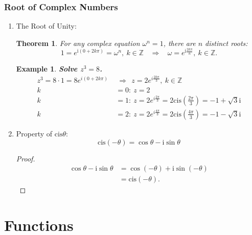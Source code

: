 \documentclass[12pt, a4paper]{article}
\newtheorem{theorem}{Theorem}[subsection]
\newtheorem{example}{Example}[subsection]
\newtheorem{proof}{Proof}[subsection]
\def\Z{{\mathbb{Z}}}
\def\i{{\mathrm{i}}}
\def\cis{\mathrm{cis}}
\begin{document}
\subsubsection{Root of Complex Numbers}
\begin{enumerate}
  \item The Root of Unity: 
  \begin{theorem}
    For any complex equation $\omega^n=1$, there are $n$ distinct roots: 
    $$1=e^{\i(0+2k\pi)}=\omega^n,\ k\in\Z\ \ \ \ \Rightarrow\ \ \ \ \omega=e^{\i\frac{2k\pi}{n}},\ k\in\Z.$$
  \end{theorem}
  \begin{example}
    \textbf{Solve $z^3=8$.}
    $$\begin{aligned}
      z^3=8\cdot 1=8e^{i(0+2k\pi)}\ &\ \Rightarrow\ \ z=2e^{i\frac{2k\pi}{3}},\ k\in\Z\\
      k&=0:\ z=2\\
      k&=1:\ z=2e^{i\frac{2\pi}{3}}=2\cis\left(\frac{2\pi}{3}\right)=-1+\sqrt{3}\i\\
      k&=2:\ z=2e^{i\frac{4\pi}{3}}=2\cis\left(\frac{4\pi}{3}\right)=-1-\sqrt{3}\i
    \end{aligned}$$
  \end{example}
  \item Property of $\cis\theta$: 
  $$\cis(-\theta)=\cos\theta-\i\sin\theta$$
  \begin{proof}
    $$\begin{aligned}
      \cos\theta-\i\sin\theta&=\cos(-\theta)+\i\sin(-\theta)\\
      &=\cis(-\theta).
    \end{aligned}$$
  \end{proof}
\end{enumerate}

\newpage
\section{Functions}
\end{document}
